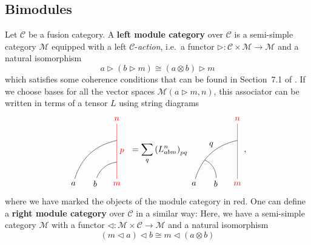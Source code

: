 
\subsection{Bimodules}

\begin{definition}
	Let $\mathcal{C}$ be a fusion category. A \textbf{left module category} over $\mathcal{C}$ is a semi-simple category $\mathcal{M}$ equipped with a left $\mathcal{C}$-\emph{action}, i.e.\ a functor $\triangleright:\mathcal{C}\times\mathcal{M}\to\mathcal{M}$ and a natural isomorphism 
		\begin{equation}
			a\triangleright(b\triangleright m)\cong(a\otimes b)\triangleright m
		\end{equation}
	which satisfies some coherence conditions that can be found in Section~7.1 of \cite{Etingof2015}. If we choose bases for all the vector spaces $\mathcal{M}(a\triangleright m,n)$, this associator can be written in terms of a tensor $L$ using string diagrams
		\begin{equation}
			\begin{tikzpicture}[scale=0.9,baseline=(current bounding box.center)]
			\node[red](m) at (0,0) {$m$};
			\node(b) at (-1,0) {$b$};
			\node(a) at (-2,0) {$a$};
			\node[red](abm) at (0,3) {$n$};
			\draw[red] (m) to node[right] {$p$} (abm);
			\draw (b) to [bend left] (0,1);
			\draw (a) to [bend left] (0,2);
			\end{tikzpicture}\ =\sum_q \left(L^n_{abm}\right)_{pq}
			\begin{tikzpicture}[scale=0.9,baseline=(current bounding box.center)]
			\node[red](m) at (0,0) {$m$};
			\node(b) at (-1,0) {$b$};
			\node(a) at (-2,0) {$a$};
			\node[red](abm) at (0,3) {$n$};
			\node(ab) at (-1.2,1.8) {$q$};
			\draw[red] (m) to (abm);
			\draw (b) to [bend right] (-1.5,1.1);
			\draw (a) to [bend left] (0,2);
			\end{tikzpicture},\label{eqn:L}
		\end{equation}
	where we have marked the objects of the module category in red. One can define a \textbf{right module category} over $\mathcal{C}$ in a similar way: Here, we have a semi-simple category $\mathcal{M}$ with a functor $\triangleleft:\mathcal{M}\times\mathcal{C}\to\mathcal{M}$ and a natural isomorphism
		\begin{equation}
			(m\triangleleft a)\triangleleft b\cong m\triangleleft(a\otimes b)

\end{equation}
\end{definition}
